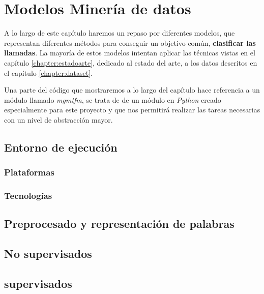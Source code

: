 \chapter{Modelos Minería de datos}
\label{chapter:modelos}

A lo largo de este capítulo haremos un repaso por diferentes modelos, que representan diferentes métodos para conseguir un objetivo común, \textbf{clasificar las llamadas}. La mayoría de estos modelos intentan aplicar las técnicas vistas en el capítulo \ref{chapter:estadoarte}, dedicado al estado del arte, a los datos descritos en el capítulo \ref{chapter:dataset}.

Una parte del código que mostraremos a lo largo del capítulo hace referencia a un módulo llamado \textit{mgmtfm}, se trata de de un módulo en \textit{Python} creado especialmente para este proyecto y que nos permitirá realizar las tareas necesarias con un nivel de abstracción mayor. 




\section{Entorno de ejecución}

\subsection{Plataformas}
\subsection{Tecnologías}


\section{Preprocesado y representación de palabras}


\section{No supervisados}



\section{supervisados}